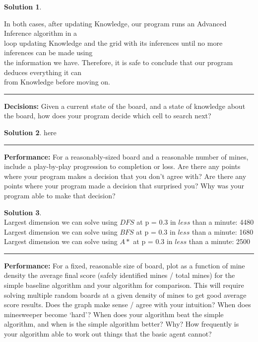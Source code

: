 \documentclass{article}
\theoremstyle{definition}
\def\fline{\rule{0.75\linewidth}{0.5pt}}
\newcommand{\finishline}{\vspace{-15pt}\begin{center}\fline\end{center}}
\newtheorem*{solution*}{Solution}
\newenvironment{solution}{\begin{solution*}}{{\finishline} \end{solution*}}
\begin{document}
\begin{solution}
\begin{tabbing}
    \>In both cases, after updating Knowledge, our program runs an Advanced Inference algorithm in a\\ \>loop updating Knowledge and the grid with its inferences until no more inferences can be made using\\ \> the information we have. Therefore, it is safe to conclude that our program deduces everything it can\\ \> from Knowledge before moving on.\\
	\end{tabbing}
\end{solution}

\smallskip

\textbf{Decisions:}
	Given a current state of the board, and a state of knowledge about the board, how does your program decide which cell to search next? 
\begin{solution}
	here
\end{solution}

\smallskip

\textbf{Performance: }
	For a reasonably-sized board and a reasonable number of mines, include a play-by-play progression to completion or loss. Are there any points where your program makes a decision that you don’t agree with?
Are there any points where your program made a decision that surprised you? 
Why was your program able to make that decision? 


\smallskip

\begin{solution} \hfill \\
	Largest dimension we can solve using $DFS$ at p = 0.3 in $less$ than a minute: 4480\\
	Largest dimension we can solve using $BFS$ at p = 0.3 in $less$ than a minute: 1680\\
	Largest dimension we can solve using $A*$ at p = 0.3 in $less$ than a minute: 2500\\
\end{solution}

\smallskip

\textbf{Performance: }
For a fixed, reasonable size of board, plot as a function of mine density the average final score (safely identified mines / total mines) for the simple baseline algorithm and your algorithm for comparison. This will require solving multiple random boards at a given density of mines to get good average score results.
Does the graph make sense / agree with your intuition? When does minesweeper become ‘hard’?
When does your algorithm beat the simple algorithm, and when is the simple algorithm better? Why?
How frequently is your algorithm able to work out things that the basic agent cannot? 
\end{document}
